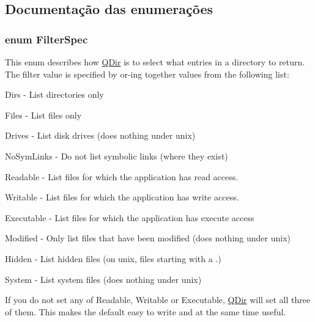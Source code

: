 \subsection{Documentação das enumerações}
\hypertarget{class_q_dir_ae5939bcf9175d1742ed9c51e042efd50}{
\subsubsection[{Filter\-Spec}]{\setlength{\rightskip}{0pt plus 5cm}enum {\bf Filter\-Spec}}}\label{class_q_dir_ae5939bcf9175d1742ed9c51e042efd50}
This enum describes how \hyperlink{class_q_dir}{Q\-Dir} is to select what entries in a directory to return. The filter value is specified by or-\/ing together values from the following list\-: 
\begin{DoxyItemize}
\item {\ttfamily Dirs} -\/ List directories only 
\item {\ttfamily Files} -\/ List files only


\item {\ttfamily Drives} -\/ List disk drives (does nothing under unix) 
\item {\ttfamily No\-Sym\-Links} -\/ Do not list symbolic links (where they exist) 
\item {\ttfamily Readable} -\/ List files for which the application has read access. 
\item {\ttfamily Writable} -\/ List files for which the application has write access. 
\item {\ttfamily Executable} -\/ List files for which the application has execute access 
\item {\ttfamily Modified} -\/ Only list files that have been modified (does nothing under unix) 
\item {\ttfamily Hidden} -\/ List hidden files (on unix, files starting with a .) 
\item {\ttfamily System} -\/ List system files (does nothing under unix) 
\end{DoxyItemize}

If you do not set any of {\ttfamily Readable}, {\ttfamily Writable} or {\ttfamily Executable}, \hyperlink{class_q_dir}{Q\-Dir} will set all three of them. This makes the default easy to write and at the same time useful.

